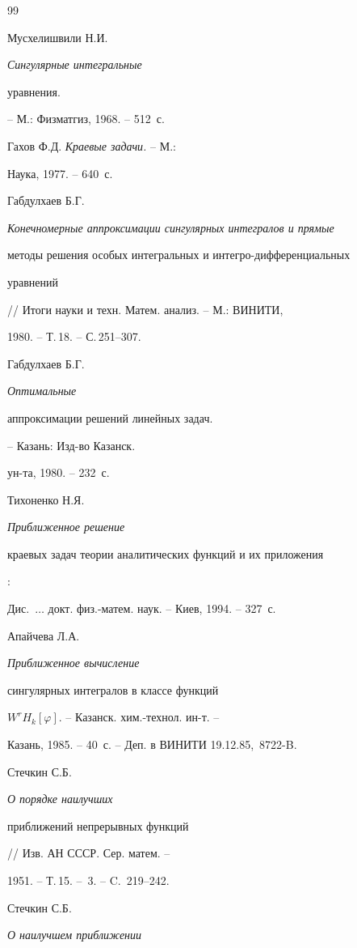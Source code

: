 \begin{thebibliography}{99}







Мусхелишвили Н.И. {\em Сингулярные интегральные


уравнения.} -- М.:  Физматгиз, 1968. -- 512~с.




Гахов Ф.Д. {\em Краевые задачи.} -- М.:


Наука, 1977. -- 640~с.




Габдулхаев Б.Г.


{\em Конечномерные аппроксимации сингулярных интегралов и прямые


методы решения особых интегральных и интегро-дифференциальных


уравнений} // Итоги науки и техн. Матем. анализ. -- М.:  ВИНИТИ,


1980. -- Т.\,18. -- С.\,251--307.




Габдулхаев Б.Г. {\em Оптимальные


аппроксимации решений линейных задач.} -- Казань: Изд-во Казанск.


ун-та, 1980. -- 232~с.




Тихоненко Н.Я. {\em Приближенное решение


краевых задач теории аналитических функций и их приложения}:


Дис.~$\dotsc$ докт. физ.-матем. наук. -- Киев, 1994. -- 327~с.




Апайчева Л.А. {\em Приближенное вычисление


сингулярных интегралов в классе функций}


$W^rH_k[\varphi]$. -- Казанск. хим.-технол. ин-т. --


Казань, 1985. -- 40~с. -- Деп. в ВИНИТИ 19.12.85, \No\,8722-B.




Стечкин С.Б. {\em О порядке наилучших


приближений непрерывных функций} // Изв. АН СССР. Сер. матем. --


1951. -- Т.\,15. -- \No\,3. -- C.~219--242.




Стечкин С.Б. {\em О наилучшем приближении


}
\end{thebibliography}
